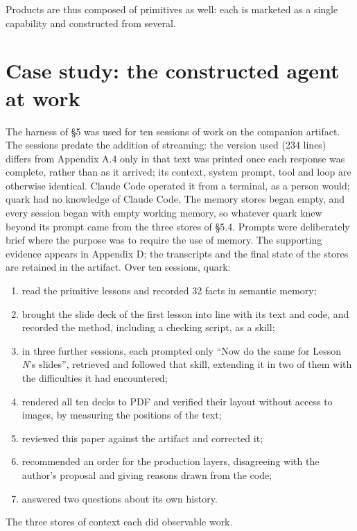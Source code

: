 Products are thus composed of primitives as well: each is marketed as a single capability and constructed from several.

\section{Case study: the constructed agent at work}

The harness of §5 was used for ten sessions of work on the companion artifact. The sessions predate the addition of streaming: the version used (234 lines) differs from Appendix A.4 only in that text was printed once each response was complete, rather than as it arrived; its context, system prompt, tool and loop are otherwise identical. Claude Code operated it from a terminal, as a person would; quark had no knowledge of Claude Code. The memory stores began empty, and every session began with empty working memory, so whatever quark knew beyond its prompt came from the three stores of §5.4. Prompts were deliberately brief where the purpose was to require the use of memory. The supporting evidence appears in Appendix D; the transcripts and the final state of the stores are retained in the artifact. Over ten sessions, quark:

\begin{enumerate}
\def\labelenumi{\arabic{enumi}.}
\tightlist
\item
  read the primitive lessons and recorded 32 facts in semantic memory;
\item
  brought the slide deck of the first lesson into line with its text and code, and recorded the method, including a checking script, as a skill;
\item
  in three further sessions, each prompted only ``Now do the same for Lesson \emph{N}'s slides'', retrieved and followed that skill, extending it in two of them with the difficulties it had encountered;
\item
  rendered all ten decks to PDF and verified their layout without access to images, by measuring the positions of the text;
\item
  reviewed this paper against the artifact and corrected it;
\item
  recommended an order for the production layers, disagreeing with the author's proposal and giving reasons drawn from the code;
\item
  answered two questions about its own history.
\end{enumerate}

The three stores of context each did observable work.

